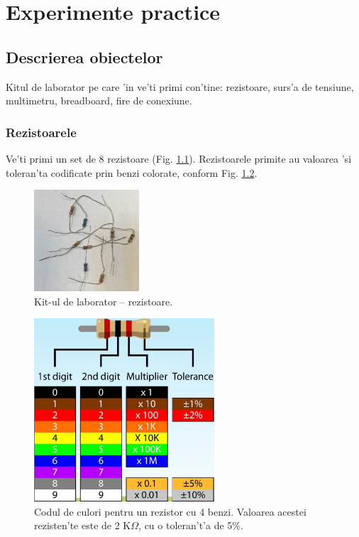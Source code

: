 \chapter{Experimente practice}

\section{Descrierea obiectelor}

Kitul de laborator pe care 'in ve'ti primi con'tine: rezistoare, surs'a de tensiune, multimetru, breadboard, fire de conexiune.

\subsection{Rezistoarele}

Ve'ti primi un set de 8 rezistoare (Fig. \ref{fig:4_rezistoare}). Rezistoarele primite au valoarea 'si toleran'ta codificate prin benzi colorate, conform Fig. \ref{fig:rezistente_cod_culori}.	

\begin{figure}[b]
	\centering
		\includegraphics[width=0.35\textwidth]{figuri/4_rezistoare}
	\caption{Kit-ul de laborator -- rezistoare.}
	\label{fig:4_rezistoare}
\end{figure}
\begin{figure}
	\centering
		\includegraphics[width=0.6\textwidth]{figuri/rezistente_cod_culori}
	\caption{Codul de culori pentru un rezistor cu 4 benzi. Valoarea acestei rezisten'te este de 2 K$\Omega$, cu o toleran't'a de 5\%.}
	\label{fig:rezistente_cod_culori}
\end{figure}

